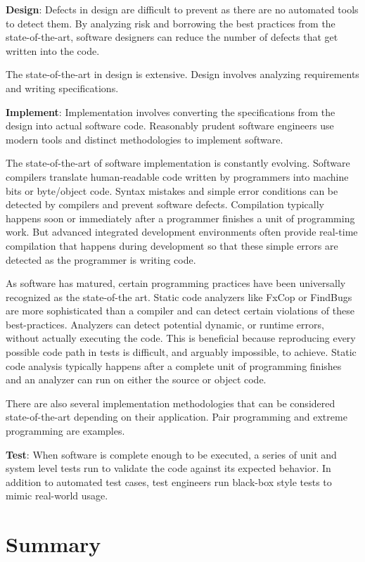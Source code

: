 \documentclass[12pt]{report}
\begin{document}
\textbf{Design}: Defects in design are difficult to prevent as there are no automated tools to detect them. By analyzing risk and borrowing the best practices from the state-of-the-art, software designers can reduce the number of defects that get written into the code. 

The state-of-the-art in design is extensive. Design involves analyzing requirements and writing specifications. 

\textbf{Implement}: Implementation involves converting the specifications from the design into actual software code. Reasonably prudent software engineers use modern tools and distinct methodologies to implement software. 

The state-of-the-art of software implementation is constantly evolving. Software compilers translate human-readable code written by programmers into machine bits or byte/object code. Syntax mistakes and simple error conditions can be detected by compilers and prevent software defects. Compilation typically happens soon or immediately after a programmer finishes a unit of programming work. But advanced integrated development environments often provide real-time compilation that happens during development so that these simple errors are detected as the programmer is writing code.  

As software has matured, certain programming practices have been universally recognized as the state-of-the art. Static code analyzers like FxCop or FindBugs are more sophisticated than a compiler and can detect certain violations of these best-practices. Analyzers can detect potential dynamic, or runtime errors, without actually executing the code. This is beneficial because reproducing every possible code path in tests is difficult, and arguably impossible, to achieve. Static code analysis typically happens after a complete unit of programming finishes and an analyzer can run on either the source or object code. 

There are also several implementation methodologies that can be considered state-of-the-art depending on their application. Pair programming and extreme programming are examples. 

\textbf{Test}: When software is complete enough to be executed, a series of unit and system level tests run to validate the code against its expected behavior. In  addition to automated test cases, test engineers run black-box style tests to mimic real-world usage.  

\section{Summary} 
\end{document}
